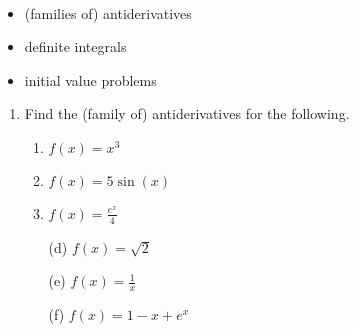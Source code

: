 \documentclass[11pt,fleqn]{article}
\begin{document}
\vspace*{-0.7in}

\begin{center}
  \Large{}\\
\end{center}
\begin{itemize}
\item (families of) antiderivatives 
\item definite integrals
\item initial value problems
\end{itemize}

\begin{enumerate}
\item Find the (family of) antiderivatives for the following.
\begin{multicols}{3}
	\begin{enumerate}
	\item $f(x)=x^3$	
	\item $f(x)=5\sin(x)$	
	\item $f(x) = \frac{e^x}{4}$	
	\end{enumerate}
\end{multicols}

\vfill

\begin{multicols}{3}
	\begin{enumerate}
	\item[(d)] $f(x)=\sqrt{2}$
	\item[(e)]  $f(x)=\frac{1}{x}$
	\item[(f)] $f(x) = 1-x+e^x$
	\end{enumerate}
\end{multicols}

\vfill


\end{enumerate}
\end{document}
